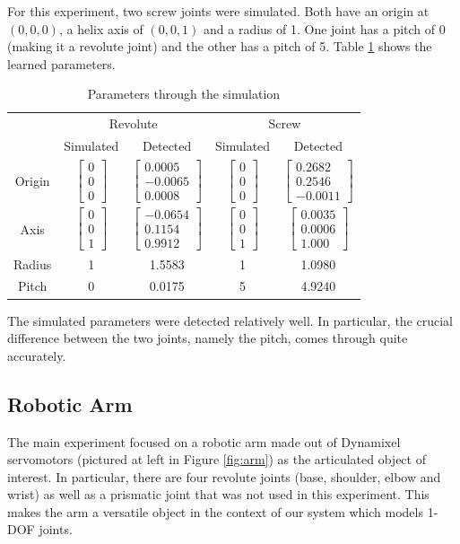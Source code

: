 \documentclass[letterpaper, 10 pt, conference]{ieeeconf}  %
\newcommand\mat[2]{\ensuremath{\left[\begin{array}{#1}#2\end{array}\right]}}
\begin{document}
For this experiment, two screw joints were simulated. Both have an origin at $(0, 0, 0)$, a helix axis of $(0, 0, 1)$ and a radius of 1. One joint has a pitch of 0 (making it a revolute joint) and the other has a pitch of 5. Table \ref{tbl:simulation} shows the learned parameters.

\begin{table}[ht]
  \begin{tabular}{c|c|c|c|c}
           & \multicolumn{2}{c}{Revolute} & \multicolumn{2}{|c}{Screw} \\
           & Simulated   & Detected    & Simulated   & Detected    \\ \hline
           Origin & $\mat{c}{0 \\ 0 \\ 0}$ & $\mat{c}{0.0005 \\ -0.0065 \\ 0.0008}$ & $\mat{c}{0 \\ 0 \\ 0}$ & $\mat{c}{0.2682 \\ 0.2546 \\ -0.0011}$ \\
    Axis   & $\mat{c}{0 \\ 0 \\ 1}$ & $\mat{c}{-0.0654 \\ 0.1154 \\ 0.9912}$ & $\mat{c}{0 \\ 0 \\ 1}$ & $\mat{c}{0.0035 \\ 0.0006 \\ 1.000}$ \\
    Radius & 1           & 1.5583      & 1           & 1.0980      \\
    Pitch  & 0           & 0.0175      & 5           & 4.9240      \\
  \end{tabular}
  \caption{Parameters through the simulation}
  \label{tbl:simulation}
\end{table}

The simulated parameters were detected relatively well. In particular, the crucial difference between the two joints, namely the pitch, comes through quite accurately.

\subsection{Robotic Arm}
The main experiment focused on a robotic arm made out of Dynamixel servomotors (pictured at left in Figure \ref{fig:arm}) as the articulated object of interest. In particular, there are four revolute joints (base, shoulder, elbow and wrist) as well as a prismatic joint that was not used in this experiment. This makes the arm a versatile object in the context of our system which models 1-DOF joints.
\end{document}
